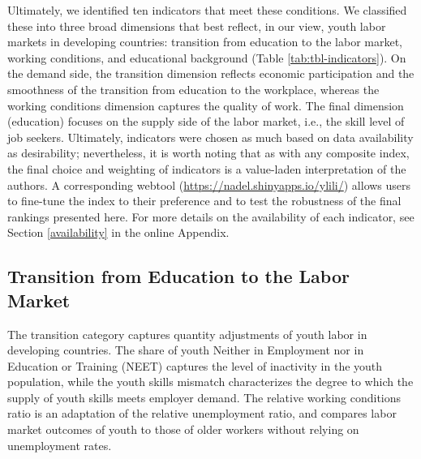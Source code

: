 \documentclass[
  a4paper, twoside, 12pt]{book}
\begin{document}
Ultimately, we identified ten indicators that meet these conditions. We classified these into three broad dimensions that best reflect, in our view, youth labor markets in developing countries: transition from education to the labor market, working conditions, and educational background (Table \ref{tab:tbl-indicators}). On the demand side, the transition dimension reflects economic participation and the smoothness of the transition from education to the workplace, whereas the working conditions dimension captures the quality of work. The final dimension (education) focuses on the supply side of the labor market, i.e., the skill level of job seekers. Ultimately, indicators were chosen as much based on data availability as desirability; nevertheless, it is worth noting that as with any composite index, the final choice and weighting of indicators is a value-laden interpretation of the authors. A corresponding webtool (\url{https://nadel.shinyapps.io/ylili/}) allows users to fine-tune the index to their preference and to test the robustness of the final rankings presented here. For more details on the availability of each indicator, see Section \ref{availability} in the online Appendix.

\begin{singlespacing}

\end{singlespacing}

\hypertarget{transition-from-education-to-the-labor-market}{%
\subsection{Transition from Education to the Labor Market}\label{transition-from-education-to-the-labor-market}}

The transition category captures quantity adjustments of youth labor in developing countries. The share of youth Neither in Employment nor in Education or Training (NEET) captures the level of inactivity in the youth population, while the youth skills mismatch characterizes the degree to which the supply of youth skills meets employer demand. The relative working conditions ratio is an adaptation of the relative unemployment ratio, and compares labor market outcomes of youth to those of older workers without relying on unemployment rates.
\end{document}
